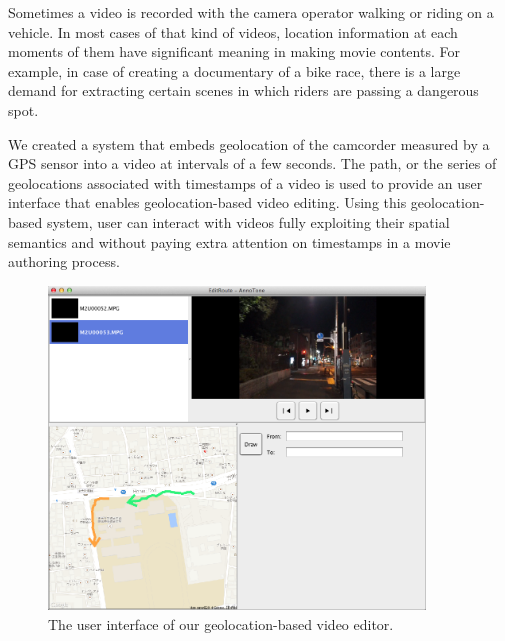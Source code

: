 
Sometimes a video is recorded with the camera operator walking or riding on a vehicle.
In most cases of that kind of videos, location information at each moments of them have significant meaning in making movie contents.
For example, in case of creating a documentary of a bike race, there is a large demand for extracting certain scenes in which riders are passing a dangerous spot.

We created a system that embeds geolocation of the camcorder measured by a GPS sensor into a video at intervals of a few seconds.
The path, or the series of geolocations associated with timestamps of a video is used to provide an user interface that enables geolocation-based video editing.
Using this geolocation-based system, user can interact with videos fully exploiting their spatial semantics and without paying extra attention on timestamps in a movie authoring process.

\begin{figure}[htbp]
 \begin{center}
  \includegraphics[width=100mm]{application_map.png}
 \end{center}
 \caption{The user interface of our geolocation-based video editor.}
 \label{fig:appl_map}
\end{figure}

